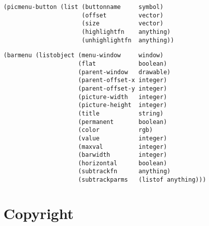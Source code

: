 \vspace*{-.2in}

\begin{verbatim}
(picmenu-button (list (buttonname     symbol)
                      (offset         vector)
                      (size           vector)
                      (highlightfn    anything)
                      (unhighlightfn  anything))
\end{verbatim}

\vspace*{-.2in}

\begin{verbatim}
(barmenu (listobject (menu-window     window)
                     (flat            boolean)
                     (parent-window   drawable)
                     (parent-offset-x integer)
                     (parent-offset-y integer)
                     (picture-width   integer)
                     (picture-height  integer)
                     (title           string)
                     (permanent       boolean)
                     (color           rgb)
                     (value           integer)
                     (maxval          integer)
                     (barwidth        integer)
                     (horizontal      boolean)
                     (subtrackfn      anything)
                     (subtrackparms   (listof anything)))
\end{verbatim}


\pagebreak

\section{Copyright}

